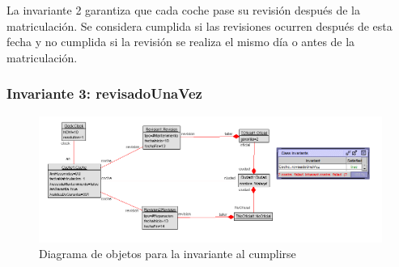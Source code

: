 \documentclass[12pt.a4paper]{article}
\begin{document}
La invariante 2 garantiza que cada coche pase su revisión después de la matriculación. Se considera cumplida si las revisiones ocurren después de esta fecha y no cumplida si la revisión se realiza el mismo día o antes de la matriculación.

\subsubsection{Invariante 3: revisadoUnaVez}
    \begin{figure}[H]
         \centering
         \includegraphics[width=1\linewidth]{Soils/3.png}
         \caption{Diagrama de objetos para la invariante al cumplirse}
         \label{Diagrama_cumplimiento}
    \end{figure}
\end{document}
